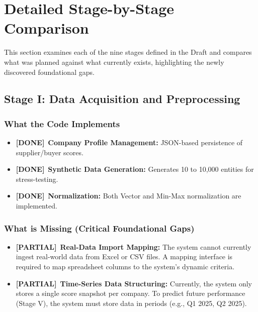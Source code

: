 \documentclass[11pt]{article}
\newcommand{\done}{\textcolor{done}{\textbf{[DONE]}}}
\newcommand{\partial}{\textcolor{partial}{\textbf{[PARTIAL]}}}
\begin{document}
\section{Detailed Stage-by-Stage Comparison}

This section examines each of the nine stages defined in the Draft and compares what was planned against what currently exists, highlighting the newly discovered foundational gaps.

\subsection{Stage I: Data Acquisition and Preprocessing}
\label{sec:stage1}

\subsubsection{What the Code Implements}
\begin{itemize}
    \item \done\ \textbf{Company Profile Management:} JSON-based persistence of supplier/buyer scores.
    \item \done\ \textbf{Synthetic Data Generation:} Generates 10 to 10,000 entities for stress-testing.
    \item \done\ \textbf{Normalization:} Both Vector and Min-Max normalization are implemented.
\end{itemize}

\subsubsection{What is Missing (Critical Foundational Gaps)}
\begin{itemize}
    \item \partial\ \textbf{Real-Data Import Mapping:} The system cannot currently ingest real-world data from Excel or CSV files. A mapping interface is required to map spreadsheet columns to the system's dynamic criteria.
    \item \partial\ \textbf{Time-Series Data Structuring:} Currently, the system only stores a single score snapshot per company. To predict future performance (Stage V), the system must store data in periods (e.g., Q1 2025, Q2 2025).
\end{itemize}
\end{document}
